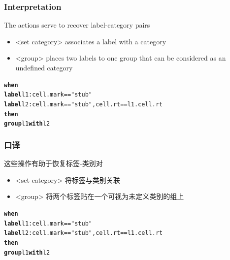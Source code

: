 \documentclass[10pt]{beamer}
\begin{document}

\begin{frame}[fragile]
\frametitle{Interpretation}
The actions serve to recover label-category pairs
\begin{itemize}
	\item \alert{<set category>} associates a label with a category
	\item \alert{<group>} places two labels to one group that can be considered as an undefined category
\end{itemize}
\footnotesize{
\begin{example}
\begin{alltt}
\textbf{when}
  \textbf{label} l1: cell.mark == "stub"
  \textbf{label} l2: cell.mark == "stub", cell.rt == l1.cell.rt
\textbf{then}
  \textbf{group} l1 \textbf{with} l2
\end{alltt}
\end{example}
}
\end{frame}

\begin{frame}[fragile]
\frametitle{口译}
这些操作有助于恢复标签-类别对
\begin{itemize}
	\item \alert{<set category>} 将标签与类别关联
	\item \alert{<group>} 将两个标签贴在一个可视为未定义类别的组上
\end{itemize}
\footnotesize{
\begin{example}
\begin{alltt}
\textbf{when}
  \textbf{label} l1: cell.mark == "stub"
  \textbf{label} l2: cell.mark == "stub", cell.rt == l1.cell.rt
\textbf{then}
  \textbf{group} l1 \textbf{with} l2
\end{alltt}
\end{example}
}
\end{frame}
\end{document}
